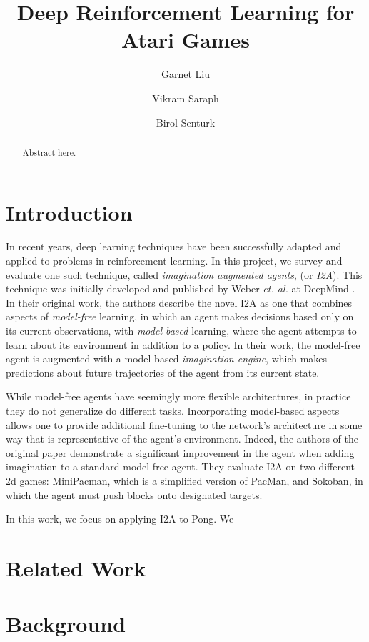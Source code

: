 \documentclass[10pt, twocolumn]{article}
\title{Deep Reinforcement Learning for Atari Games}
\author{Garnet Liu \and Vikram Saraph \and Birol Senturk}
\begin{document}
\maketitle

\begin{abstract}

Abstract here.

\end{abstract}

\section{Introduction}

In recent years, deep learning techniques have been successfully adapted and applied to problems
in reinforcement learning. In this project, we survey and evaluate one such technique, called \emph{imagination augmented agents},
(or \emph{I2A}). This technique was initially developed and published by Weber \emph{et. al.} at DeepMind \cite{}. In their original
work, the authors describe the novel I2A as one that combines aspects of \emph{model-free} learning, in which an agent makes decisions
based only on its current observations, with \emph{model-based} learning, where the agent attempts to learn about its environment
in addition to a policy. In their work, the model-free agent is augmented with a model-based \emph{imagination engine}, which
makes predictions about future trajectories of the agent from its current state.

While model-free agents have seemingly more flexible architectures, in practice they do not generalize do different tasks. Incorporating 
model-based aspects allows one to provide additional fine-tuning to the network's architecture in some way that is representative of the 
agent's environment. Indeed, the authors of the original paper demonstrate a significant improvement in the agent when adding 
imagination to a standard model-free agent. They evaluate I2A on two different 2d games: MiniPacman, which is a simplified version of 
PacMan, and Sokoban, in which the agent must push blocks onto designated targets.

In this work, we focus on applying I2A to Pong. We 

\section{Related Work}

\section{Background}
\end{document}

